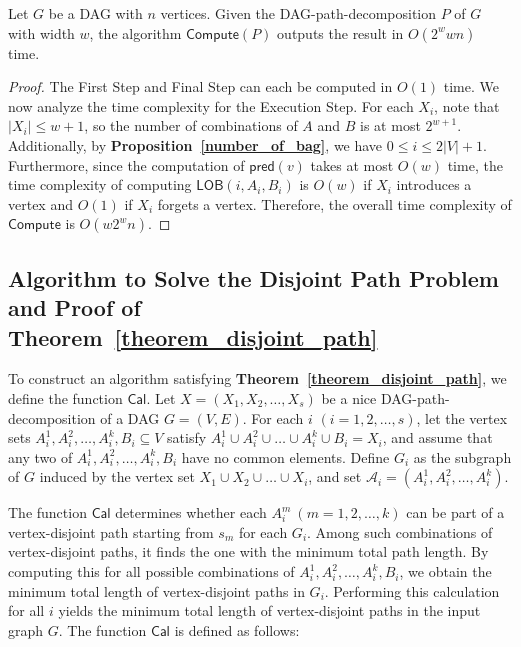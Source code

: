 \documentclass[runningheads]{llncs}
\theoremstyle{plain}
\theoremstyle{definition}
\begin{document}
\begin{lemma}\label{complexity_lob}
    Let $G$ be a DAG with $n$ vertices. Given the DAG-path-decomposition $P$ of $G$ with width $w$, the algorithm $\mathsf{Compute}(P)$ outputs the result in $O(2^w w n)$ time.
\end{lemma}
    
\begin{proof}
    The First Step and Final Step can each be computed in $O(1)$ time. We now analyze the time complexity for the Execution Step. For each $X_i$, note that $|X_i| \leq w+1$, so the number of combinations of $A$ and $B$ is at most $2^{w+1}$. Additionally, by \textbf{Proposition~\ref{number_of_bag}}, we have $0 \leq i \leq 2|V|+1$. Furthermore, since the computation of $\mathsf{pred}(v)$ takes at most $O(w)$ time, the time complexity of computing $\mathsf{LOB}(i, A_i, B_i)$ is $O(w)$ if $X_i$ introduces a vertex and $O(1)$ if $X_i$ forgets a vertex. Therefore, the overall time complexity of $\mathsf{Compute}$ is $O(w 2^w n)$.
\end{proof}












\subsection{Algorithm to Solve the Disjoint Path Problem and Proof of \textbf{Theorem~\ref{theorem_disjoint_path}}}\label{appendix_B6}

To construct an algorithm satisfying \textbf{Theorem~\ref{theorem_disjoint_path}}, we define the function $\mathsf{Cal}$. Let $X = (X_1, X_2, \dots, X_s)$ be a nice DAG-path-decomposition of a DAG $G = (V, E)$. For each $i$ $(i = 1, 2, \dots, s)$, let the vertex sets $A^1_i, A^2_i, \dots, A^k_i, B_i \subseteq V$ satisfy $A^1_i \cup A^2_i \cup \dots \cup A^k_i \cup B_i = X_i$, and assume that any two of $A^1_i, A^2_i, \dots, A^k_i, B_i$ have no common elements. Define $G_i$ as the subgraph of $G$ induced by the vertex set $X_1 \cup X_2 \cup \dots \cup X_i$, and set $\mathscr{A}_i = (A^1_i, A^2_i, \dots, A^k_i)$.

The function $\mathsf{Cal}$ determines whether each $A^m_i\ (m=1, 2, \dots, k)$ can be part of a vertex-disjoint path starting from $s_m$ for each $G_i$. Among such combinations of vertex-disjoint paths, it finds the one with the minimum total path length. By computing this for all possible combinations of $A^1_i, A^2_i, \dots, A^k_i, B_i$, we obtain the minimum total length of vertex-disjoint paths in $G_i$. Performing this calculation for all $i$ yields the minimum total length of vertex-disjoint paths in the input graph $G$. The function $\mathsf{Cal}$ is defined as follows:
\end{document}
